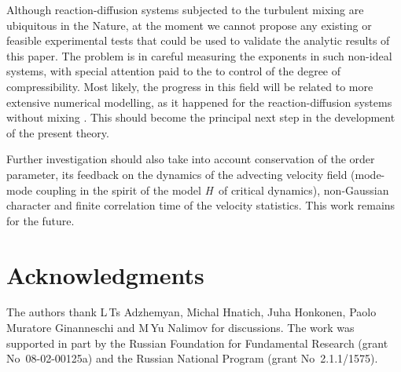 \documentclass[12pt]{iopart}
\begin{document}
Although reaction-diffusion systems subjected to the turbulent mixing are ubiquitous in the Nature,
at the moment we cannot propose any existing or feasible experimental tests that could be used to validate the analytic results of this paper. The problem is in careful measuring the exponents in such non-ideal systems, with special
attention paid to the to control of the degree of compressibility. Most likely, the progress in this field will be related to more extensive numerical modelling, as it happened for the reaction-diffusion systems without mixing \cite{Hinr}. This should become the principal next step in the development of the present theory.


Further investigation should also take into account conservation of the order
parameter, its feedback on the dynamics of the advecting velocity field
(mode-mode coupling in the spirit of the model {\it H}\, of critical
dynamics), non-Gaussian character and finite correlation time of the
velocity statistics. This work remains for the future.


\section*{Acknowledgments}
The authors thank L\,Ts Adzhemyan, Michal Hnatich, Juha Honkonen,
Paolo Muratore Ginanneschi and M\,Yu Nalimov for discussions.
The work was supported in part by the Russian Foundation for Fundamental
Research (grant No~08-02-00125a) and the Russian National Program
(grant No~2.1.1/1575).
\end{document}

